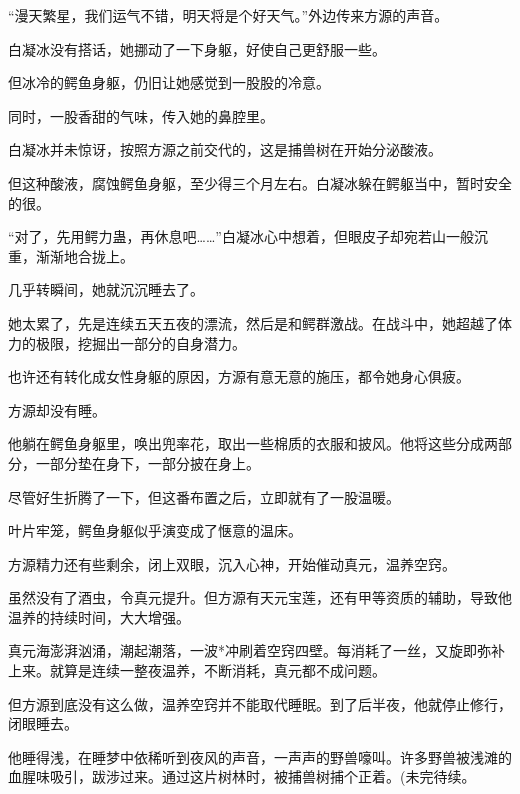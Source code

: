 \begin{this_body}
“漫天繁星，我们运气不错，明天将是个好天气。”外边传来方源的声音。

白凝冰没有搭话，她挪动了一下身躯，好使自己更舒服一些。

但冰冷的鳄鱼身躯，仍旧让她感觉到一股股的冷意。

同时，一股香甜的气味，传入她的鼻腔里。

白凝冰并未惊讶，按照方源之前交代的，这是捕兽树在开始分泌酸液。

但这种酸液，腐蚀鳄鱼身躯，至少得三个月左右。白凝冰躲在鳄躯当中，暂时安全的很。

“对了，先用鳄力蛊，再休息吧……”白凝冰心中想着，但眼皮子却宛若山一般沉重，渐渐地合拢上。

几乎转瞬间，她就沉沉睡去了。

她太累了，先是连续五天五夜的漂流，然后是和鳄群激战。在战斗中，她超越了体力的极限，挖掘出一部分的自身潜力。

也许还有转化成女性身躯的原因，方源有意无意的施压，都令她身心俱疲。

方源却没有睡。

他躺在鳄鱼身躯里，唤出兜率花，取出一些棉质的衣服和披风。他将这些分成两部分，一部分垫在身下，一部分披在身上。

尽管好生折腾了一下，但这番布置之后，立即就有了一股温暖。

叶片牢笼，鳄鱼身躯似乎演变成了惬意的温床。

方源精力还有些剩余，闭上双眼，沉入心神，开始催动真元，温养空窍。

虽然没有了酒虫，令真元提升。但方源有天元宝莲，还有甲等资质的辅助，导致他温养的持续时间，大大增强。

真元海澎湃汹涌，潮起潮落，一波*冲刷着空窍四壁。每消耗了一丝，又旋即弥补上来。就算是连续一整夜温养，不断消耗，真元都不成问题。

但方源到底没有这么做，温养空窍并不能取代睡眠。到了后半夜，他就停止修行，闭眼睡去。

他睡得浅，在睡梦中依稀听到夜风的声音，一声声的野兽嚎叫。许多野兽被浅滩的血腥味吸引，跋涉过来。通过这片树林时，被捕兽树捕个正着。(未完待续。

\end{this_body}


